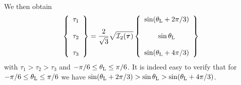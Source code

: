 We then obtain 
\begin{equation}
\left\{
\begin{array}{c}
\tau_1 \\ \\
\tau_2 \\ \\
\tau_3
\end{array}
\right\}
= \frac{2  }{\sqrt{3}}\sqrt{ {\cal I}_2({\bm \tau})  }
\left\{
\begin{array}{c}
\sin (\theta_{\rm L} + 2\pi/3)  \\ \\
\sin \theta_{\rm L}   \\ \\
\sin (\theta_{\rm L} + 4\pi/3  )
\end{array}
\right\}
\end{equation}
with $\tau_1>\tau_2>\tau_3$ and $-\pi/6 \leq \theta_{\rm L} \leq \pi/6$. It is indeed easy to verify that 
for $-\pi/6 \leq \theta_{\rm L} \leq \pi/6$ we have  
$\sin (\theta_{\rm L} + 2\pi/3) > \sin \theta_{\rm L} > \sin (\theta_{\rm L} + 4\pi/3)$.

